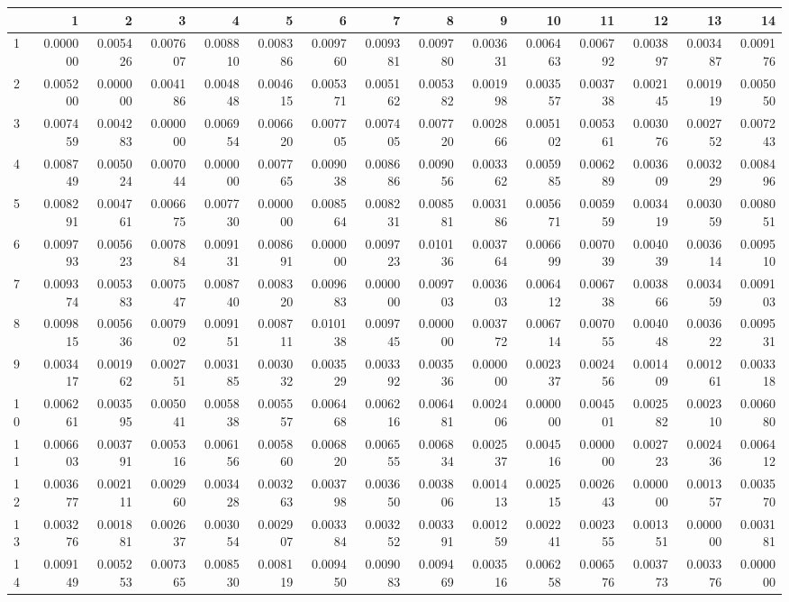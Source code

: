 \begin{tabular}{lrrrrrrrrrrrrrr}
\toprule
{} &        1  &        2  &        3  &        4  &        5  &        6  &        7  &        8  &        9  &        10 &        11 &        12 &        13 &        14 \\
\midrule
1  &  0.000000 &  0.005426 &  0.007607 &  0.008810 &  0.008386 &  0.009760 &  0.009381 &  0.009780 &  0.003631 &  0.006463 &  0.006792 &  0.003897 &  0.003487 &  0.009176 \\
2  &  0.005200 &  0.000000 &  0.004186 &  0.004848 &  0.004615 &  0.005371 &  0.005162 &  0.005382 &  0.001998 &  0.003557 &  0.003738 &  0.002145 &  0.001919 &  0.005050 \\
3  &  0.007459 &  0.004283 &  0.000000 &  0.006954 &  0.006620 &  0.007705 &  0.007405 &  0.007720 &  0.002866 &  0.005102 &  0.005361 &  0.003076 &  0.002752 &  0.007243 \\
4  &  0.008749 &  0.005024 &  0.007044 &  0.000000 &  0.007765 &  0.009038 &  0.008686 &  0.009056 &  0.003362 &  0.005985 &  0.006289 &  0.003609 &  0.003229 &  0.008496 \\
5  &  0.008291 &  0.004761 &  0.006675 &  0.007730 &  0.000000 &  0.008564 &  0.008231 &  0.008581 &  0.003186 &  0.005671 &  0.005959 &  0.003419 &  0.003059 &  0.008051 \\
6  &  0.009793 &  0.005623 &  0.007884 &  0.009131 &  0.008691 &  0.000000 &  0.009723 &  0.010136 &  0.003764 &  0.006699 &  0.007039 &  0.004039 &  0.003614 &  0.009510 \\
7  &  0.009374 &  0.005383 &  0.007547 &  0.008740 &  0.008320 &  0.009683 &  0.000000 &  0.009703 &  0.003603 &  0.006412 &  0.006738 &  0.003866 &  0.003459 &  0.009103 \\
8  &  0.009815 &  0.005636 &  0.007902 &  0.009151 &  0.008711 &  0.010138 &  0.009745 &  0.000000 &  0.003772 &  0.006714 &  0.007055 &  0.004048 &  0.003622 &  0.009531 \\
9  &  0.003417 &  0.001962 &  0.002751 &  0.003185 &  0.003032 &  0.003529 &  0.003392 &  0.003536 &  0.000000 &  0.002337 &  0.002456 &  0.001409 &  0.001261 &  0.003318 \\
10 &  0.006261 &  0.003595 &  0.005041 &  0.005838 &  0.005557 &  0.006468 &  0.006216 &  0.006481 &  0.002406 &  0.000000 &  0.004501 &  0.002582 &  0.002310 &  0.006080 \\
11 &  0.006603 &  0.003791 &  0.005316 &  0.006156 &  0.005860 &  0.006820 &  0.006555 &  0.006834 &  0.002537 &  0.004516 &  0.000000 &  0.002723 &  0.002436 &  0.006412 \\
12 &  0.003677 &  0.002111 &  0.002960 &  0.003428 &  0.003263 &  0.003798 &  0.003650 &  0.003806 &  0.001413 &  0.002515 &  0.002643 &  0.000000 &  0.001357 &  0.003570 \\
13 &  0.003276 &  0.001881 &  0.002637 &  0.003054 &  0.002907 &  0.003384 &  0.003252 &  0.003391 &  0.001259 &  0.002241 &  0.002355 &  0.001351 &  0.000000 &  0.003181 \\
14 &  0.009149 &  0.005253 &  0.007365 &  0.008530 &  0.008119 &  0.009450 &  0.009083 &  0.009469 &  0.003516 &  0.006258 &  0.006576 &  0.003773 &  0.003376 &  0.000000 \\
\bottomrule
\end{tabular}
